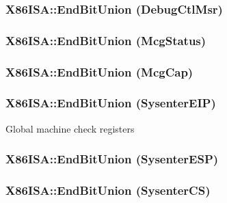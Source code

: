 \label{namespaceX86ISA_a104adc3f41d2497c9d77064215abdf8f}
\hypertarget{namespaceX86ISA_a63612265d014f8c5c3a82013db316e2a}{
\subsubsection[{EndBitUnion}]{\setlength{\rightskip}{0pt plus 5cm}X86ISA::EndBitUnion (DebugCtlMsr)}}
\label{namespaceX86ISA_a63612265d014f8c5c3a82013db316e2a}
\hypertarget{namespaceX86ISA_a502085fd93bf084e4ade6c567c3c766f}{
\subsubsection[{EndBitUnion}]{\setlength{\rightskip}{0pt plus 5cm}X86ISA::EndBitUnion (McgStatus)}}
\label{namespaceX86ISA_a502085fd93bf084e4ade6c567c3c766f}
\hypertarget{namespaceX86ISA_a74677b253e3ee39aae0941f8ec5d2bd0}{
\subsubsection[{EndBitUnion}]{\setlength{\rightskip}{0pt plus 5cm}X86ISA::EndBitUnion (McgCap)}}
\label{namespaceX86ISA_a74677b253e3ee39aae0941f8ec5d2bd0}
\hypertarget{namespaceX86ISA_a11cd84b3d92d7451d3a3d3c2a36d8763}{
\subsubsection[{EndBitUnion}]{\setlength{\rightskip}{0pt plus 5cm}X86ISA::EndBitUnion (SysenterEIP)}}
\label{namespaceX86ISA_a11cd84b3d92d7451d3a3d3c2a36d8763}
Global machine check registers \hypertarget{namespaceX86ISA_ab76cf8e722dcf9a853dc8ef123aeda8a}{
\subsubsection[{EndBitUnion}]{\setlength{\rightskip}{0pt plus 5cm}X86ISA::EndBitUnion (SysenterESP)}}
\label{namespaceX86ISA_ab76cf8e722dcf9a853dc8ef123aeda8a}
\hypertarget{namespaceX86ISA_a43a50aa605aeac723bd1a4a2dc118e56}{
\subsubsection[{EndBitUnion}]{\setlength{\rightskip}{0pt plus 5cm}X86ISA::EndBitUnion (SysenterCS)}}
